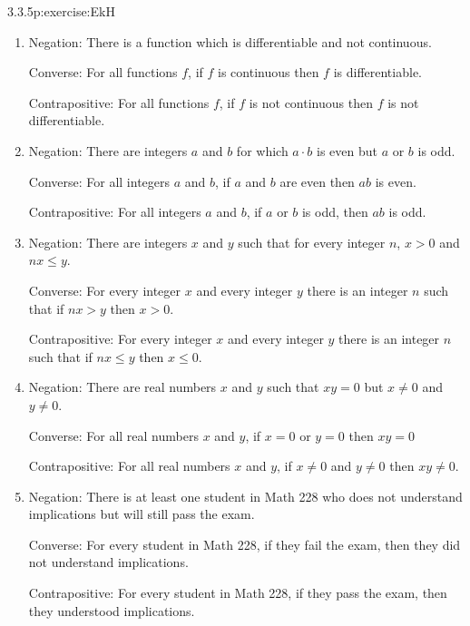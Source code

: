 \documentclass[twoside,11pt,]{book}
\numberwithin{equation}{chapter}
\newcommand{\gt}{>}
\begin{document}
\begin{divisionsolution}{3.3.5}{}{p:exercise:EkH}
\begin{enumerate}[label=(\alph*)]
\par
Converse: For all natural numbers \(n\), if \(n\) is solitary, then \(n\) is prime.%
\par
Contrapositive: For all natural numbers \(n\), if \(n\) is not solitary then \(n\) is not prime.%
\item{}Negation: There is a function which is differentiable and not continuous.%
\par
Converse: For all functions \(f\), if \(f\) is continuous then \(f\) is differentiable.%
\par
Contrapositive: For all functions \(f\), if \(f\) is not continuous then \(f\) is not differentiable.%
\item{}Negation: There are integers \(a\) and \(b\) for which \(a\cdot b\) is even but \(a\) or \(b\) is odd.%
\par
Converse: For all integers \(a\) and \(b\), if \(a\) and \(b\) are even then \(ab\) is even.%
\par
Contrapositive: For all integers \(a\) and \(b\), if \(a\) or \(b\) is odd, then \(ab\) is odd.%
\item{}Negation: There are integers \(x\) and \(y\) such that for every integer \(n\), \(x \gt 0\) and \(nx \le y\).%
\par
Converse: For every integer \(x\) and every integer \(y\) there is an integer \(n\) such that if \(nx >
y\) then \(x > 0\).%
\par
Contrapositive: For every integer \(x\) and every integer \(y\) there is an integer \(n\) such that if \(nx \le y\) then \(x \le 0\).%
\item{}Negation: There are real numbers \(x\) and \(y\) such that \(xy = 0\) but \(x \ne 0\) and \(y \ne 0\).%
\par
Converse: For all real numbers \(x\) and \(y\), if \(x = 0\) or \(y = 0\) then \(xy = 0\)%
\par
Contrapositive: For all real numbers \(x\) and \(y\), if \(x \ne 0\) and \(y \ne 0\) then \(xy \ne 0\).%
\item{}Negation: There is at least one student in Math 228 who does not understand implications but will still pass the exam.%
\par
Converse: For every student in Math 228, if they fail the exam, then they did not understand implications.%
\par
Contrapositive: For every student in Math 228, if they pass the exam, then they understood implications.%
\end{enumerate}
%
\end{divisionsolution}%
\end{document}
